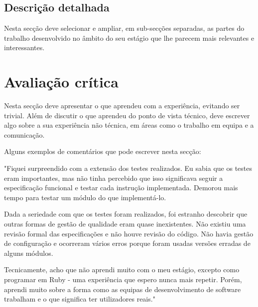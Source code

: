 \documentclass{article}
\begin{document}
\subsection{Descrição detalhada}
Nesta secção deve  selecionar e ampliar, em sub-secções separadas, as partes do trabalho desenvolvido no âmbito do seu estágio que lhe parecem mais relevantes e interessantes.

\cleardoublepage
\section{Avaliação crítica}
Nesta secção deve apresentar o que aprendeu com a experiência, evitando ser trivial. Além de discutir o que aprendeu do ponto de vista técnico, deve escrever algo sobre a sua experiência não técnica, em áreas como o trabalho em equipa e a comunicação.

Alguns exemplos de comentários que pode escrever nesta secção:

"Fiquei surpreendido com a extensão dos testes realizados. Eu sabia que os testes eram importantes, mas não tinha percebido que isso significava seguir a especificação funcional e testar cada instrução implementada. Demorou mais tempo para testar um módulo do que  implementá-lo.

Dada a seriedade com que os testes foram realizados, foi estranho descobrir que outras formas de gestão de qualidade eram quase inexistentes. Não existiu uma revisão formal das especificações e não houve revisão do código. Não havia gestão de configuração e ocorreram vários erros porque foram usadas versões erradas de alguns módulos.

Tecnicamente, acho que não aprendi muito com o meu estágio, excepto como programar em Ruby - uma experiência que espero nunca mais repetir. Porém, aprendi muito sobre a forma como as equipas de desenvolvimento de software trabalham e o que significa ter utilizadores reais."


\cleardoublepage


\label{referencias}
\end{document}
